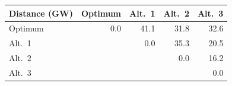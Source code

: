 \begin{tabular}{lrrrr}
\toprule
\textbf{Distance (GW)} & \textbf{Optimum} & \textbf{Alt.~1} & \textbf{Alt.~2} & \textbf{Alt.~3}\\
\midrule
Optimum & 0.0 & 41.1 & 31.8 & 32.6\\
Alt.~1 &  & 0.0 & 35.3 & 20.5\\
Alt.~2 &  &  & 0.0 & 16.2\\
Alt.~3 &  &  &  & 0.0\\
\bottomrule
\end{tabular}
